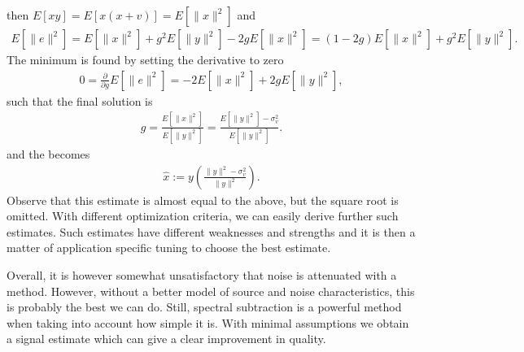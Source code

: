 \documentclass[letterpaper,10pt,english]{jupyterBook}
\begin{document}
\sphinxAtStartPar
then \(
E\left[xy\right]=E\left[x(x+v)\right]=E\left[\|x\|^2\right]
\) and
\begin{equation*}
\begin{split} E\left[\|e\|^2\right] = E\left[\|x\|^2\right] + g^2
E\left[\|y\|^2\right] - 2g E\left[\|x\|^2\right] =
(1-2g)E\left[\|x\|^2\right] + g^2 E\left[\|y\|^2\right]. \end{split}
\end{equation*}
\sphinxAtStartPar
The minimum is found by setting the derivative to zero
\begin{equation*}
\begin{split} 0 = \frac{\partial}{\partial g}E\left[\|e\|^2\right] =
-2E\left[\|x\|^2\right] + 2 g E\left[\|y\|^2\right], \end{split}
\end{equation*}
\sphinxAtStartPar
such that the final solution is
\begin{equation*}
\begin{split} g = \frac{E\left[\|x\|^2\right]}{E\left[\|y\|^2\right]} =
\frac{E\left[\|y\|^2\right]-\sigma_v^2}{E\left[\|y\|^2\right]}.
\end{split}
\end{equation*}
\sphinxAtStartPar
and the  becomes
\begin{equation*}
\begin{split} \hat x := y \left(\frac{\|y\|^2 - \sigma_v^2}{\|y\|^2}\right).
\end{split}
\end{equation*}
\sphinxAtStartPar
Observe that this estimate is almost equal to the above, but the square
root is omitted. With different optimization criteria, we can easily
derive further such estimates. Such estimates have different weaknesses
and strengths and it is then a matter of application specific tuning to
choose the best estimate.

\sphinxAtStartPar
Overall, it is however somewhat unsatisfactory that  noise is
attenuated with a  method. However, without a better
model of source and noise characteristics, this is probably the best we
can do. Still, spectral subtraction is a powerful method when taking
into account how simple it is. With minimal assumptions we obtain a
signal estimate which can give a clear improvement in quality.
\end{document}
